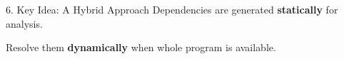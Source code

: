 \begin{roundedbeamerblock}{6. Key Idea: A Hybrid Approach}
    \vspace{5mm}
    Dependencies are generated \textbf{statically} for analysis.\par
    \vspace{5mm}
    Resolve them \textbf{dynamically} when whole program is available.\par
    \vspace{5mm}

\end{roundedbeamerblock}
